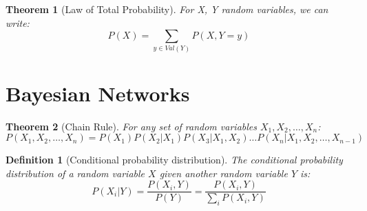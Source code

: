 \documentclass[11pt]{article}
\numberwithin{equation}{section}
\theoremstyle{boldStyle}
\theoremstyle{boldBlueStyle}
\theoremstyle{boldPurpleStyle}
\newtheorem{theorem}{Theorem}[section]
\theoremstyle{boldRedStyle}
\newtheorem{definition}{Definition}[section]
\begin{document}
\begin{theorem}[Law of Total Probability]
    For X, Y random variables, we can write:
    \begin{equation*}
        P(X) = \sum_{y \in Val(Y)} P(X, Y = y) 
    \end{equation*}
\end{theorem}












\newpage
\section{Bayesian Networks}

\begin{theorem}[Chain Rule]
    For any set of random variables $X_1, X_2, \ldots, X_n$:
    \begin{equation*}
        P(X_1, X_2, \ldots, X_n) = P(X_1)P(X_2 | X_1)P(X_3 | X_1, X_2) \ldots P(X_n | X_1, X_2, \ldots, X_{n-1})
    \end{equation*}
\end{theorem}

\begin{definition}[Conditional probability distribution]
    The conditional probability distribution of a random variable $X$ given another random variable $Y$ is:
    \begin{equation*}
        P(X_i | Y) = \frac{P(X_i, Y)}{P(Y)} = \frac{P(X_i, Y)}{\sum_{i} P(X_i, Y)}
    \end{equation*}
\end{definition}
\end{document}
